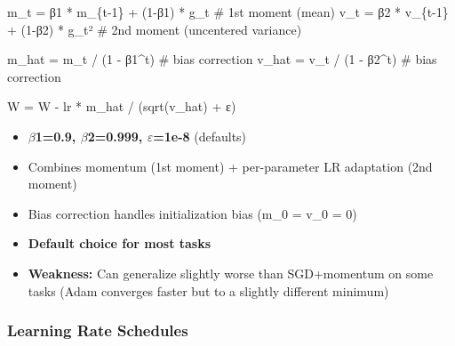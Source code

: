\documentclass[11pt]{article}
\providecommand{\tightlist}{\setlength{\itemsep}{1pt}\setlength{\parskip}{0pt}}
\newenvironment{Shaded}{\begin{snugshade}}{\end{snugshade}}
\newcommand{\CommentTok}[1]{\textcolor[rgb]{0.48,0.49,0.49}{#1}}
\newcommand{\DecValTok}[1]{\textcolor[rgb]{0.96,0.45,0.00}{#1}}
\newcommand{\NormalTok}[1]{\textcolor[rgb]{0.81,0.81,0.76}{#1}}
\newcommand{\OperatorTok}[1]{\textcolor[rgb]{0.81,0.81,0.76}{#1}}
\begin{document}
\begin{Shaded}
\begin{Highlighting}[]
\NormalTok{m\_t }\OperatorTok{=}\NormalTok{ β}\DecValTok{1} \OperatorTok{*}\NormalTok{ m\_\{t}\OperatorTok{{-}}\DecValTok{1}\NormalTok{\} }\OperatorTok{+}\NormalTok{ (}\DecValTok{1}\OperatorTok{{-}}\NormalTok{β}\DecValTok{1}\NormalTok{) }\OperatorTok{*}\NormalTok{ g\_t          }\CommentTok{\# 1st moment (mean)}
\NormalTok{v\_t }\OperatorTok{=}\NormalTok{ β}\DecValTok{2} \OperatorTok{*}\NormalTok{ v\_\{t}\OperatorTok{{-}}\DecValTok{1}\NormalTok{\} }\OperatorTok{+}\NormalTok{ (}\DecValTok{1}\OperatorTok{{-}}\NormalTok{β}\DecValTok{2}\NormalTok{) }\OperatorTok{*}\NormalTok{ g\_t²         }\CommentTok{\# 2nd moment (uncentered variance)}

\NormalTok{m\_hat }\OperatorTok{=}\NormalTok{ m\_t }\OperatorTok{/}\NormalTok{ (}\DecValTok{1} \OperatorTok{{-}}\NormalTok{ β}\DecValTok{1}\OperatorTok{\^{}}\NormalTok{t)                    }\CommentTok{\# bias correction}
\NormalTok{v\_hat }\OperatorTok{=}\NormalTok{ v\_t }\OperatorTok{/}\NormalTok{ (}\DecValTok{1} \OperatorTok{{-}}\NormalTok{ β}\DecValTok{2}\OperatorTok{\^{}}\NormalTok{t)                    }\CommentTok{\# bias correction}

\NormalTok{W }\OperatorTok{=}\NormalTok{ W }\OperatorTok{{-}}\NormalTok{ lr }\OperatorTok{*}\NormalTok{ m\_hat }\OperatorTok{/}\NormalTok{ (sqrt(v\_hat) }\OperatorTok{+}\NormalTok{ ε)}
\end{Highlighting}
\end{Shaded}

\begin{itemize}
\tightlist
\item
  \textbf{\(\beta\)1=0.9, \(\beta\)2=0.999, \(\varepsilon\)=1e-8} (defaults)
\item
  Combines momentum (1st moment) + per-parameter LR adaptation (2nd moment)
\item
  Bias correction handles initialization bias (m\_0 = v\_0 = 0)
\item
  \textbf{Default choice for most tasks}
\item
  \textbf{Weakness:} Can generalize slightly worse than SGD+momentum on some tasks (Adam converges faster but to a slightly different minimum)
\end{itemize}

\subsubsection{Learning Rate Schedules}\label{learning-rate-schedules}
\end{document}
